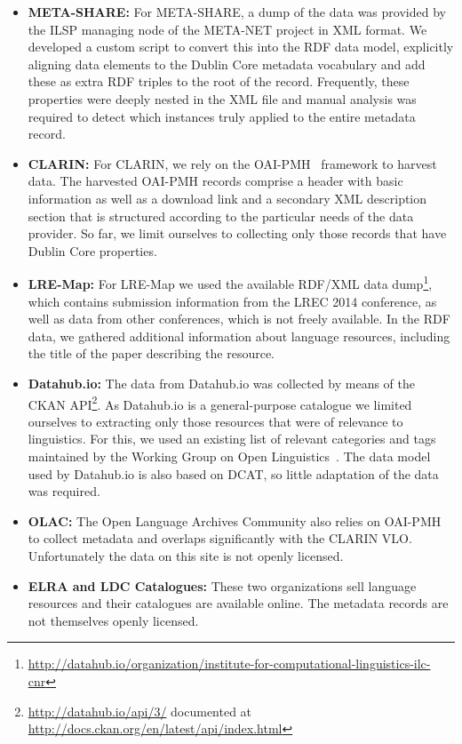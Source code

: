 \documentclass[11pt]{article}
\begin{document}
\begin{itemize}
\item \textbf{META-SHARE:} For META-SHARE, a dump of the data was
provided by the ILSP managing node of the META-NET project in XML format. We developed a custom script to convert this
into the RDF data model, explicitly aligning data elements to the
Dublin Core metadata vocabulary and add these as extra RDF triples to the root
of the record. Frequently, these properties were deeply nested in the XML file
and manual analysis was required to detect which instances truly applied to the
entire metadata record.

\item \textbf{CLARIN:} For CLARIN, we rely on the OAI-PMH~\cite{sompel2004resource} framework to harvest data.
The harvested OAI-PMH records comprise a header with basic information as well as a download link and a secondary XML description
section that is structured according to the particular needs of the data provider.
So far, we limit ourselves to collecting only those records that
have Dublin Core properties.
\item \textbf{LRE-Map:} For LRE-Map we used the available RDF/XML data
    dump\footnote{\url{http://datahub.io/organization/institute-for-computational-linguistics-ilc-cnr}},
    which contains submission information from the LREC 2014 conference, as well as data
    from other conferences, which is not freely available.
    In the RDF data, we gathered additional
    information about language resources, including the title of the paper 
    describing the resource.
\item \textbf{Datahub.io:} The data from Datahub.io was collected by means of
    the CKAN API\footnote{\url{http://datahub.io/api/3/} documented at
    \url{http://docs.ckan.org/en/latest/api/index.html}}. As Datahub.io
is a general-purpose catalogue we limited ourselves to extracting only those
resources that were of relevance to linguistics. For this, we used an existing
list of relevant categories and tags maintained by the Working Group on Open
Linguistics~\cite{chiarcos2012open}. The data model used by Datahub.io is 
also based on DCAT, so little adaptation of the data was required.
\item \textbf{OLAC:} The Open Language Archives Community also relies on OAI-PMH
    to collect metadata and overlaps significantly with the CLARIN VLO.
    Unfortunately the data on this site is not openly licensed.
\item \textbf{ELRA and LDC Catalogues:} These two organizations sell language
    resources and their catalogues are available online. The metadata records are
    not themselves openly licensed.
\end{itemize}
\end{document}
